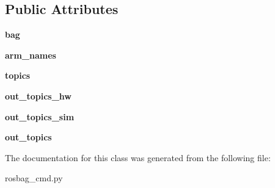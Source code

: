 \subsection*{Public Attributes}
\begin{DoxyCompactItemize}
\item 
\hypertarget{classrosbag__cmd_1_1bag__writer_a551c55e0a1a83967f36d201a69ca8c9e}{{\bfseries bag}}\label{classrosbag__cmd_1_1bag__writer_a551c55e0a1a83967f36d201a69ca8c9e}

\item 
\hypertarget{classrosbag__cmd_1_1bag__writer_ab399c6228b4565779c6310bf7dd41d61}{{\bfseries arm\-\_\-names}}\label{classrosbag__cmd_1_1bag__writer_ab399c6228b4565779c6310bf7dd41d61}

\item 
\hypertarget{classrosbag__cmd_1_1bag__writer_a6506ba2d39c3a9aa22955d2495f03100}{{\bfseries topics}}\label{classrosbag__cmd_1_1bag__writer_a6506ba2d39c3a9aa22955d2495f03100}

\item 
\hypertarget{classrosbag__cmd_1_1bag__writer_aae0afd9bf54fb4c9fc7528d714a9f356}{{\bfseries out\-\_\-topics\-\_\-hw}}\label{classrosbag__cmd_1_1bag__writer_aae0afd9bf54fb4c9fc7528d714a9f356}

\item 
\hypertarget{classrosbag__cmd_1_1bag__writer_aec31bacb1a6f50ae35ece1cd8465db32}{{\bfseries out\-\_\-topics\-\_\-sim}}\label{classrosbag__cmd_1_1bag__writer_aec31bacb1a6f50ae35ece1cd8465db32}

\item 
\hypertarget{classrosbag__cmd_1_1bag__writer_a1ec7603ca0873e8b0b2f1f8b2d831a15}{{\bfseries out\-\_\-topics}}\label{classrosbag__cmd_1_1bag__writer_a1ec7603ca0873e8b0b2f1f8b2d831a15}

\end{DoxyCompactItemize}


The documentation for this class was generated from the following file\-:\begin{DoxyCompactItemize}
\item 
rosbag\-\_\-cmd.\-py\end{DoxyCompactItemize}
